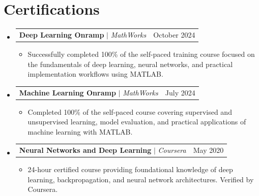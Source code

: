 \documentclass[letterpaper,11pt]{article}
\makeatletter
\newcommand{\resumeItem}[1]{
  \item\small{
    {#1 \vspace{-2pt}}
  }
}
\newcommand{\resumeProjectHeading}[2]{
    \item
    \begin{tabular*}{0.97\textwidth}{l@{\extracolsep{\fill}}r}
      \small#1 & #2 \\
    \end{tabular*}\vspace{-7pt}
}
\newcommand{\resumeSubHeadingListStart}{\begin{itemize}[leftmargin=0.15in, label={}]}
\newcommand{\resumeSubHeadingListEnd}{\end{itemize}}
\newcommand{\resumeItemListStart}{\begin{itemize}}
\newcommand{\resumeItemListEnd}{\end{itemize}\vspace{-5pt}}
\makeatother
\begin{document}
\section{\textcolor{blue(pigment)}{Certifications}}
  \resumeSubHeadingListStart
    \resumeProjectHeading
      {\textbf{Deep Learning Onramp} $|$ \emph{MathWorks}}{October 2024}
      \resumeItemListStart
        \resumeItem{Successfully completed 100\% of the self-paced training course focused on the fundamentals of deep learning, neural networks, and practical implementation workflows using MATLAB.}
      \resumeItemListEnd

    \resumeProjectHeading
      {\textbf{Machine Learning Onramp} $|$ \emph{MathWorks}}{July 2024}
      \resumeItemListStart
        \resumeItem{Completed 100\% of the self-paced course covering supervised and unsupervised learning, model evaluation, and practical applications of machine learning with MATLAB.}
      \resumeItemListEnd

    \resumeProjectHeading
      {\textbf{Neural Networks and Deep Learning} $|$ \emph{Coursera}}{May 2020}
      \resumeItemListStart
        \resumeItem{24-hour certified course providing foundational knowledge of deep learning, backpropagation, and neural network architectures. Verified by Coursera.}
      \resumeItemListEnd
  \resumeSubHeadingListEnd
\end{document}
